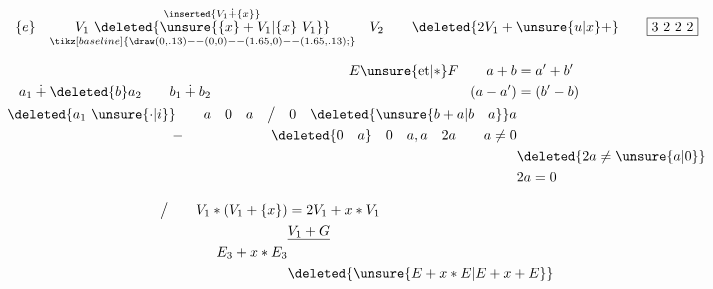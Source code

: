 \[
\{e\}\quad\underset{\tikz[baseline]{\draw (0,.13)--(0,0)--(1.65,0)--(1.65,.13);}}{V_1\ \overset{\inserted{V_1\mathbin{\dot+}\{x\}}}{\deleted{\unsure{\{x\}+V_1|\{x\}\ V_1}}}}\quad V_2\qquad
\deleted{2V_1+\unsure{u|x}+}\qquad\boxed{3\ 2\ 2\ 2}
\]

\[
\begin{aligned}
&&E\unsure{\text{et}|\ast}F\qquad a+b&=a'+b'\\
a_1\mathbin{\dot+}\deleted{b}a_2\qquad b_1\mathbin{\dot+}b_2&& (a-a')&=(b'-b)\\
\deleted{a_1\ \unsure{\cdot|i}}\qquad a&&0\quad a\quad\big/\quad0\quad\deleted{\unsure{b+a|b\quad a}}a\\
-\qquad&&\deleted{0\quad a}\quad0\quad a,a\quad2a\qquad a\ne0\\
&&&\deleted{2a\ne\unsure{a|0}}\\
&&&2a=0
\end{aligned}
\]


\[
\begin{aligned}
\big/\qquad V_1\ast(V_1+\{x\})&=2V_1+x\ast V_1\\
&\underline{V_1+G}\\
E_3+x\ast E_3&\\
&\deleted{\unsure{E+x\ast E|E+x+E}}
\end{aligned}
\]

